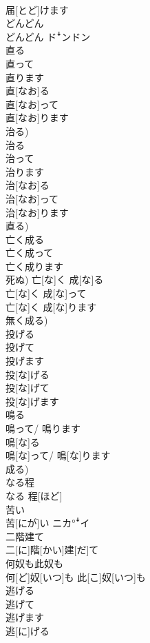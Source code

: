 \documentclass[8pt]{extreport}
\begin{document}
\begin{CJK}{UTF8}{min}
\\	届[とど]けます	
\\	どんどん	
\\	どんどん	ドꜜンドン
\\	直る 
\\	直って 
\\	直ります	
\\	直[なお]る 
\\	直[なお]って 
\\	直[なお]ります 
\\	治る)	
\\	治る 
\\	治って 
\\	治ります	
\\	治[なお]る 
\\	治[なお]って 
\\	治[なお]ります 
\\	直る)	
\\	亡く成る 
\\	亡く成って 
\\	亡く成ります	
\\	死ぬ)	亡[な]く 成[な]る 
\\	亡[な]く 成[な]って 
\\	亡[な]く 成[な]ります 
\\	無く成る)	
\\	投げる 
\\	投げて 
\\	投げます	
\\	投[な]げる 
\\	投[な]げて 
\\	投[な]げます	
\\	鳴る 
\\	鳴って/ 鳴ります	
\\	鳴[な]る 
\\	鳴[な]って/ 鳴[な]ります 
\\	成る)	
\\	なる程	
\\	なる 程[ほど]	
\\	苦い	
\\	苦[にが]い	ニカ°ꜜイ
\\	二階建て	
\\	二[に]階[かい]建[だ]て	
\\	何奴も此奴も	
\\	何[ど]奴[いつ]も 此[こ]奴[いつ]も	
\\	逃げる 
\\	逃げて 
\\	逃げます	
\\	逃[に]げる 

\end{CJK}
\end{document}
